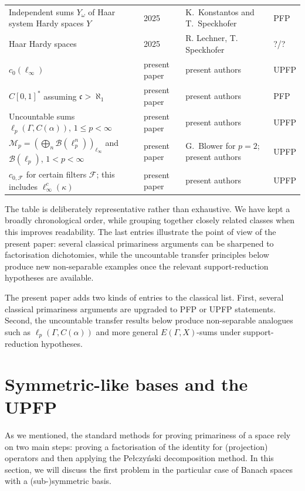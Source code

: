 \documentclass[11pt]{amsart}
\theoremstyle{plain}
\theoremstyle{definition}
\numberwithin{equation}{section}
\newcommand{\Bop}{\mathcal{B}}
\renewcommand{\le}{\leqslant}
\begin{document}
\begin{longtable}{@{}L{0.30\textwidth}L{0.08\textwidth}L{0.29\textwidth}L{0.23\textwidth}@{}}
Independent sums $Y_\omega$ of Haar system Hardy spaces $Y$ & 2025 &
K.~Konstantos and T.~Speckhofer \cite{KonstantosSpeckhofer2025} & PFP \\

Haar Hardy spaces & 2025 &
R. Lechner, T. Speckhofer \cite{LechnerSpeckhofer2025} & ?/? \\

$c_0(\ell_\infty)$
& present paper
& present authors
& UPFP\\

$C[0,1]^*$ assuming $\mathfrak{c} > \aleph_1$ & present paper &
present authors & PFP \\

Uncountable sums $\ell_p(\Gamma,C(\alpha))$, $1\le p<\infty$ & present paper &
present authors & UPFP\\

$\mathcal M_p=(\bigoplus_n\Bop(\ell_p^n))_{\ell_\infty}$ and $\Bop(\ell_p)$, $1<p<\infty$ & present paper &
G.~Blower for $p=2$; present authors & UPFP \\
$c_{0, \mathcal{F}}$ for certain filters $\mathcal{F}$; this includes $\ell_\infty^c(\kappa)$ & present paper & present authors & UPFP \\
\bottomrule
\end{longtable}
The table is deliberately representative rather than exhaustive.  We have kept a broadly chronological order, while grouping together closely related classes when this improves readability.  The last entries illustrate the point of view of the present paper: several classical primariness arguments can be sharpened to factorisation dichotomies, while the uncountable transfer principles below produce new non-separable examples once the relevant support-reduction hypotheses are available.

The present paper adds two kinds of entries to the classical list. First, several classical primariness arguments are upgraded to PFP or UPFP statements. Second, the uncountable transfer results below produce non-separable analogues such as $\ell_p(\Gamma,C(\alpha))$ and more general $E(\Gamma,X)$-sums under support-reduction hypotheses.
\section{Symmetric-like bases and the UPFP}\label{sec: symmetric-like-basis}

As we mentioned, the standard methods for proving primariness of a space rely on two main steps: proving a factorisation of the identity for (projection) operators and then applying the Pe{\l}czy\'nski decomposition method. In this section, we will discuss the first problem in the particular case of Banach spaces with a (sub-)symmetric basis. 
\end{document}
